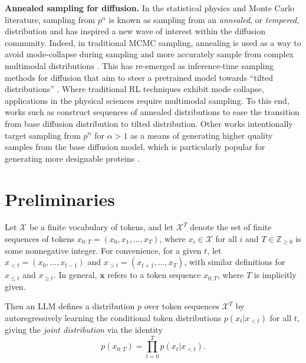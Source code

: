 \documentclass{article}
\renewcommand{\paragraph}[1]{\vspace{.1em}\noindent\textbf{#1}}
\begin{document}
\paragraph{Annealed sampling for diffusion.} In the statistical physics and Monte Carlo literature, sampling from $p^{\alpha}$ is known as sampling from an \textit{annealed}, or \textit{tempered}, distribution \citep{neal1998annealedimportance} and has inspired a new wave of interest within the diffusion community. Indeed, in traditional MCMC sampling, annealing is used as a way to avoid mode-collapse during sampling and more accurately sample from complex multimodal distributions \citep{latuszynski2025mcmcmultimodal}. This has re-emerged as inference-time sampling methods for diffusion that aim to steer a pretrained model towards ``tilted distributions'' \citep{du2023reduce, kim2025testtimealignment, karan2025reguidance, wang2025inference, kong2025diffusionconstrainedopt, zhang2025inference}. Where traditional RL techniques exhibit mode collapse, applications in the physical sciences \citep{sambridge2014paralleltempering} require multimodal sampling. To this end, works such as \cite{du2023reduce, wang2025inference, kim2025testtimealignment} construct sequences of annealed distributions to ease the transition from base diffusion distribution to tilted distribution. Other works \citep{skreta2025feynmankacorrectors, xu2025temporalscorerescaling} intentionally target sampling from $p^{\alpha}$ for $\alpha > 1$ as a means of generating higher quality samples from the base diffusion model, which is particularly popular for generating more designable proteins  \citep{geffner2025proteina}.


\section{Preliminaries}
Let $\mathcal{X}$ be a finite vocabulary of tokens, and let $\mathcal{X}^T$ denote the set of finite sequences of tokens $x_{0:T} = (x_0, x_1, \dots, x_T)$, where $x_i \in \mathcal{X}$ for all $i$ and $T \in \mathbb{Z}_{\geq 0}$ is some nonnegative integer. For convenience, for a given $t$, let $x_{<t} = (x_0, \dots, x_{t-1})$ and $x_{>t} = (x_{t+1}, \dots, x_{T})$, with similar definitions for $x_{\leq t}$ and $x_{\geq t}$. In general, $\mathbf{x}$ refers to a token sequence $x_{0:T}$, where $T$ is implicitly given. 


Then an LLM defines a distribution $p$ over token sequences $\mathcal{X}^T$ by autoregressively learning the conditional token distributions $p(x_t | x_{<t})$ for all $t$, giving the \textit{joint distribution} via the identity
\begin{equation}\label{eq:joint}
    p(x_{0:T}) = \prod_{t=0}^T p(x_t | x_{<t}).
\end{equation}
\end{document}
